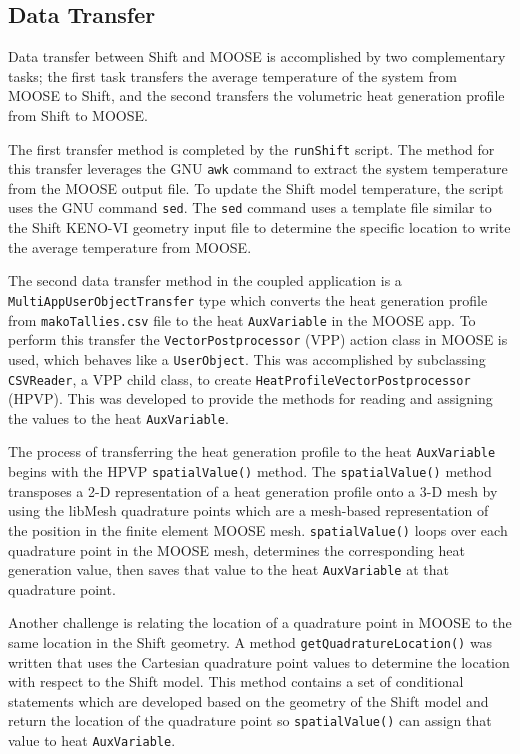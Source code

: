 \documentclass{anstrans}
\begin{document}
\subsection{Data Transfer}
Data transfer between Shift and MOOSE is accomplished by two complementary tasks; the first task transfers the average temperature of the system from MOOSE to Shift, and the second transfers the volumetric heat generation profile from Shift to MOOSE.

The first transfer method is completed by the \texttt{runShift} script. The method for this transfer leverages the GNU \texttt{awk} command to extract the system temperature from the MOOSE output file. To update the Shift model temperature, the script uses the GNU command \texttt{sed}. The \texttt{sed} command uses a template file similar to the Shift KENO-VI geometry input file to determine the specific location to write the average temperature from MOOSE.  

The second data transfer method in the coupled application is a \texttt{MultiAppUserObjectTransfer} type which converts the heat generation profile from \texttt{makoTallies.csv} file to the heat \texttt{AuxVariable} in the MOOSE app. To perform this transfer the \texttt{VectorPostprocessor} (VPP) action class in MOOSE is used, which behaves like a \texttt{UserObject}. This was accomplished by subclassing \texttt{CSVReader}, a VPP child class, to create \texttt{HeatProfileVectorPostprocessor} (HPVP). This was developed to provide the methods for reading and assigning the values to the heat \texttt{AuxVariable}. 

The process of transferring the heat generation profile to the heat \texttt{AuxVariable} begins with the HPVP \texttt{spatialValue()} method. The \texttt{spatialValue()} method transposes a 2-D representation of a heat generation profile onto a 3-D mesh by using the libMesh quadrature points which are a mesh-based representation of the position in the finite element MOOSE mesh. \texttt{spatialValue()} loops over each quadrature point in the MOOSE mesh, determines the corresponding heat generation value, then saves that value to the heat \texttt{AuxVariable} at that quadrature point. 

Another challenge is relating the location of a quadrature point in MOOSE to the same location in the Shift geometry. A method \texttt{getQuadratureLocation()} was written that uses the Cartesian quadrature point values to determine the location with respect to the Shift model. This method contains a set of conditional statements which are developed based on the geometry of the Shift model and return the location of the quadrature point so \texttt{spatialValue()} can assign that value to heat \texttt{AuxVariable}. 
\end{document}
